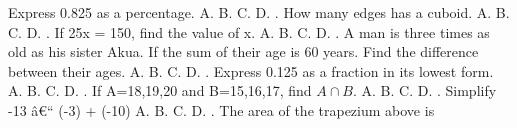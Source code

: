 \documentclass{article}
\begin{document}
\begin{multicols}{2}
Express 0.825 as a percentage. \newline \indent A. \newline \indent B. \newline \indent C. \newline \indent D.  \newline{}. How many edges has a cuboid. \newline \indent A. \newline \indent B. \newline \indent C. \newline \indent D.  \newline{}. If 25x = 150, find the value of x. \newline \indent A. \newline \indent B. \newline \indent C. \newline \indent D.  \newline{}. A man is three times as old as his sister Akua. If the sum of their age is 60 years. Find the difference between their ages. \newline \indent A. \newline \indent B. \newline \indent C. \newline \indent D.  \newline{}. Express 0.125 as a fraction in its lowest form. \newline \indent A. \newline \indent B. \newline \indent C. \newline \indent D.  \newline{}. If A={18,19,20} and B={15,16,17}, find \(A \cap B\). \newline \indent A. \newline \indent B. \newline \indent C. \newline \indent D.  \newline{}. Simplify -13 â€“ (-3) + (-10) \newline \indent A. \newline \indent B. \newline \indent C. \newline \indent D.  \newline{}. The area of the trapezium above is\newline
  

\end{multicols}
\end{document}
